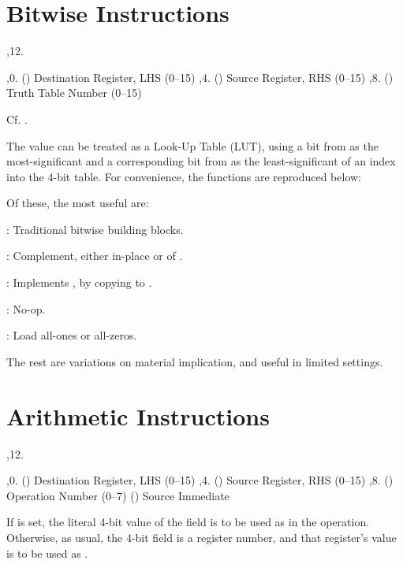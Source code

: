 \section{Bitwise Instructions}

\noindent\ins{},12. 

\li \ins{},0. () Destination Register, LHS (0--15)
\li \ins{},4. () Source Register, RHS (0--15)
\li \ins{},8. () Truth Table Number (0--15)

Cf.  .

The value  can be treated as a Look-Up Table (LUT), using a bit from
 as the most-significant and a corresponding bit from  as the
least-significant of an index into the 4-bit table. For convenience, the
functions are reproduced below:

\bigskip
{
	\tabskip=3pt
}
\bigskip

Of these, the most useful are:

: Traditional bitwise building blocks.

: Complement, either in-place or of .

: Implements , by copying  to .

: No-op.

: Load all-ones or all-zeros.

The rest are variations on material implication, and useful in limited
settings.

\section{Arithmetic Instructions}

\noindent\ins{},12. 

\li \ins{},0. () Destination Register, LHS (0--15)
\li \ins{},4. () Source Register, RHS (0--15)
\li \ins{},8. () Operation Number (0--7)
\li \ins{} () Source Immediate

If  is set, the literal 4-bit value of the  field is to be used
as  in the operation. Otherwise, as usual, the 4-bit field is a register
number, and that register's value is to be used as .

